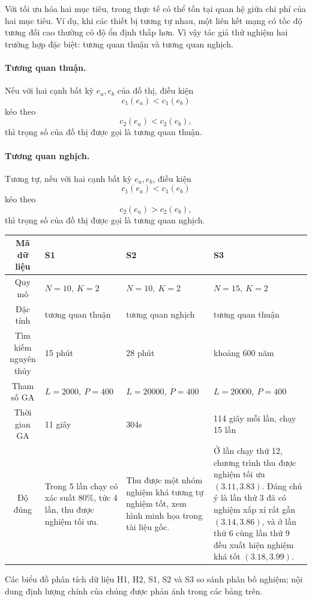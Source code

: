 \documentclass[11pt]{article}
\begin{document}
Với tối ưu hóa hai mục tiêu, trong thực tế có thể tồn tại quan hệ giữa chi phí
của hai mục tiêu. Ví dụ, khi các thiết bị tương tự nhau, một liên kết mạng có
tốc độ tương đối cao thường có độ ổn định thấp hơn. Vì vậy tác giả thử nghiệm
hai trường hợp đặc biệt: tương quan thuận và tương quan nghịch.

\paragraph{Tương quan thuận.}
Nếu với hai cạnh bất kỳ \(e_a,e_b\) của đồ thị, điều kiện
\[
  c_1(e_a) < c_1(e_b)
\]
kéo theo
\[
  c_2(e_a) < c_2(e_b),
\]
thì trọng số của đồ thị được gọi là tương quan thuận.

\paragraph{Tương quan nghịch.}
Tương tự, nếu với hai cạnh bất kỳ \(e_a,e_b\), điều kiện
\[
  c_1(e_a) < c_1(e_b)
\]
kéo theo
\[
  c_2(e_a) > c_2(e_b),
\]
thì trọng số của đồ thị được gọi là tương quan nghịch.

\begin{center}
\small
\begin{tabular}{c|p{3.2cm}|p{3.2cm}|p{4.2cm}}
\textbf{Mã dữ liệu} & \textbf{S1} & \textbf{S2} & \textbf{S3}\\ \hline
Quy mô & \(N=10,\ K=2\) & \(N=10,\ K=2\) & \(N=15,\ K=2\)\\
Đặc tính & tương quan thuận & tương quan nghịch & tương quan thuận\\
Tìm kiếm nguyên thủy & 15 phút & 28 phút & khoảng 600 năm\\
Tham số GA & \(L=2000,\ P=400\) & \(L=20000,\ P=400\) &
\(L=20000,\ P=400\)\\
Thời gian GA & 11 giây & 304s & 114 giây mỗi lần, chạy 15 lần\\
Độ đúng & Trong 5 lần chạy có xác suất \(80\%\), tức 4 lần, thu được nghiệm
tối ưu. & Thu được một nhóm nghiệm khá tương tự nghiệm tốt, xem hình minh họa
trong tài liệu gốc. & Ở lần chạy thứ 12, chương trình thu được nghiệm tối ưu
\((3.11,3.83)\). Đáng chú ý là lần thứ 3 đã có nghiệm xấp xỉ rất gần
\((3.14,3.86)\), và ở lần thứ 6 cùng lần thứ 9 đều xuất hiện nghiệm khá tốt
\((3.18,3.99)\).
\end{tabular}
\end{center}

Các biểu đồ phân tích dữ liệu H1, H2, S1, S2 và S3 so sánh phân bố nghiệm;
nội dung định lượng chính của chúng được phản ánh trong các bảng trên.
\end{document}
